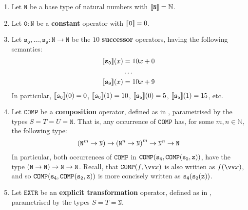 \begin{definition} \cite{cobham-1965}

\begin{enumerate}[label=(\arabic*)]

\item Let $\mathtt{N}$ be a base type of natural numbers with ${\mathopen{}\left\llbracket{\mathtt{N}}\right\rrbracket\mathclose{}}
= \mathbb{N}$.

\item Let $\mathtt{0} : \mathtt{N}$ be a \textbf{constant} operator with
${\mathopen{}\left\llbracket{\mathtt{0}}\right\rrbracket\mathclose{}} = 0$.

\item Let $\mathtt{s_0}, \ldots, \mathtt{s_9} : \mathtt{N} \rightarrow
\mathtt{N}$ be the $10$ \textbf{successor} operators, having the following
semantics:\begin{align*}
%
\sem{\mathtt{s_0}}\p{x} &= 10x + 0 \\
%
&\ldots \\
%
\sem{\mathtt{s_9}}\p{x} &= 10x + 9
%
\end{align*} In particular, ${\mathopen{}\left\llbracket{\mathtt{s_0}}\right\rrbracket\mathclose{}}{\mathopen{}\left({0}\right)\mathclose{}} = 0$,
${\mathopen{}\left\llbracket{\mathtt{s_0}}\right\rrbracket\mathclose{}}{\mathopen{}\left({1}\right)\mathclose{}} = 10$, ${\mathopen{}\left\llbracket{\mathtt{s_5}}\right\rrbracket\mathclose{}}{\mathopen{}\left({0}\right)\mathclose{}} = 5$,
${\mathopen{}\left\llbracket{\mathtt{s_5}}\right\rrbracket\mathclose{}}{\mathopen{}\left({1}\right)\mathclose{}} = 15$, etc. 

\item Let $\mathtt{COMP}$ be a \textbf{composition} operator, defined as in
, parametrised by the types $S=T=U=\mathtt{N}$.
That is, any occurrence of $\mathtt{COMP}$ has, for  some $m,n\in\mathbb{N}$,
the following type:\begin{align*}
%
\p{\mathtt{N}^m \rightarrow \mathtt{N}} \rightarrow \p{\mathtt{N}^n \rightarrow
\mathtt{N}}^m \rightarrow \mathtt{N}^n \rightarrow \mathtt{N}
%
\end{align*} In particular, both occurrences of $\mathtt{COMP}$ in
$\mathtt{COMP}{\mathopen{}\left({\mathtt{s_4}, \mathtt{COMP}{\mathopen{}\left({\mathtt{s_2}, \mathtt{z}}\right)\mathclose{}}}\right)\mathclose{}}$,
have the type ${\mathopen{}\left({\mathtt{N} \rightarrow \mathtt{N}}\right)\mathclose{}} \rightarrow \mathtt{N}
\rightarrow \mathtt{N}$. Recall, that $\mathtt{COMP}\p{f,\vect{x}}$ is also
written as $f\p{\vect{x}}$, and so $\mathtt{COMP}{\mathopen{}\left({\mathtt{s_4},
\mathtt{COMP}{\mathopen{}\left({\mathtt{s_2}, \mathtt{z}}\right)\mathclose{}}}\right)\mathclose{}}$ is more concisely written as
$\mathtt{s_4}{\mathopen{}\left({\mathtt{s_2}{\mathopen{}\left({\mathtt{z}}\right)\mathclose{}}}\right)\mathclose{}}$.

\item Let $\mathtt{EXTR}$ be an \textbf{explicit transformation} operator,
defined as in , parametrised by the types
$S=T=\mathtt{N}$.


\end{enumerate}
\end{definition}
